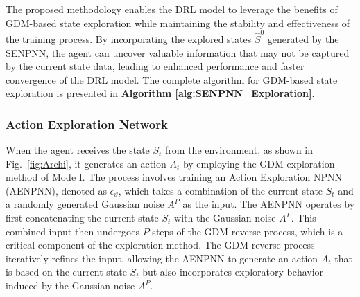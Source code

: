 \documentclass[comsoc,journal]{IEEEtran}
\begin{document}

The proposed methodology enables the DRL model to leverage the benefits of GDM-based state exploration while maintaining the stability and effectiveness of the training process. By incorporating the explored states $\hat{S}^{0}$ generated by the SENPNN, the agent can uncover valuable information that may not be captured by the current state data, leading to enhanced performance and faster convergence of the DRL model. The complete algorithm for GDM-based state exploration is presented in \textbf{Algorithm \ref{alg:SENPNN_Exploration}}.
   
\subsubsection{Action Exploration Network} 
When the agent receives the state $S_t$ from the environment, as shown in Fig.~\ref{fig:Archi}, it generates an action $A_t$ by employing the GDM exploration method of Mode I. The process involves training an Action Exploration NPNN (AENPNN), denoted as $\epsilon_{\vartheta}$, which takes a combination of the current state $S_t$ and a randomly generated Gaussian noise $A^P$ as the input.
The AENPNN operates by first concatenating the current state $S_t$ with the Gaussian noise $A^P$. This combined input then undergoes $P$ steps of the GDM reverse process, which is a critical component of the exploration method. The GDM reverse process iteratively refines the input, allowing the AENPNN to generate an action $A_t$ that is based on the current state $S_t$ but also incorporates exploratory behavior induced by the Gaussian noise $A^P$.
\end{document}
